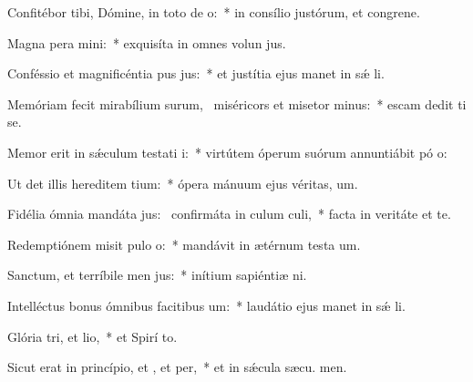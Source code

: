 \item Confitébor tibi, Dómine, in toto de o:~* in consílio justórum, et congrene.
\item Magna pera mini:~* exquisíta in omnes volun jus.
\item Conféssio et magnificéntia pus jus:~* et justítia ejus manet in sǽ li.
\item Memóriam fecit mirabílium surum,~\pscross{} miséricors et misetor minus:~* escam dedit ti se.
\item Memor erit in sǽculum testati i:~* virtútem óperum suórum annuntiábit pó o:
\item Ut det illis hereditem tium:~* ópera mánuum ejus véritas,  um.
\item Fidélia ómnia mandáta jus:~\pscross{} confirmáta in culum culi,~* facta in veritáte et te.
\item Redemptiónem misit pulo o:~* mandávit in ætérnum testa um.
\item Sanctum, et terríbile men jus:~* inítium sapiéntiæ  ni.
\item Intelléctus bonus ómnibus facitibus um:~* laudátio ejus manet in sǽ li.
\item Glória tri, et lio,~* et Spirí to.
\item Sicut erat in princípio, et , et per,~* et in sǽcula sæcu. men.
